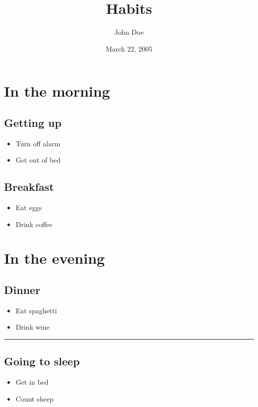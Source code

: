 \documentclass[
]{article}
\title{Habits}
\author{John Doe}
\date{March 22, 2005}
\providecommand{\tightlist}{%
  \setlength{\itemsep}{0pt}\setlength{\parskip}{0pt}}
\begin{document}
\maketitle

\hypertarget{in-the-morning}{%
\section{In the morning}\label{in-the-morning}}

\hypertarget{getting-up}{%
\subsection{Getting up}\label{getting-up}}

\begin{itemize}
\tightlist
\item
  Turn off alarm
\item
  Get out of bed
\end{itemize}

\hypertarget{breakfast}{%
\subsection{Breakfast}\label{breakfast}}

\begin{itemize}
\tightlist
\item
  Eat eggs
\item
  Drink coffee
\end{itemize}

\hypertarget{in-the-evening}{%
\section{In the evening}\label{in-the-evening}}

\hypertarget{dinner}{%
\subsection{Dinner}\label{dinner}}

\begin{itemize}
\tightlist
\item
  Eat spaghetti
\item
  Drink wine
\end{itemize}

\begin{center}\rule{0.5\linewidth}{\linethickness}\end{center}

\hypertarget{going-to-sleep}{%
\subsection{Going to sleep}\label{going-to-sleep}}

\begin{itemize}
\tightlist
\item
  Get in bed
\item
  Count sheep
\end{itemize}
\end{document}
